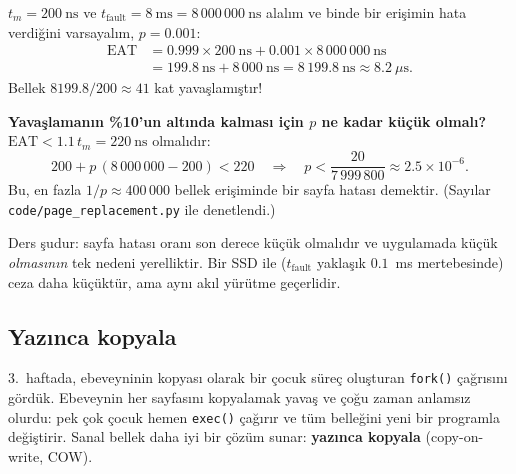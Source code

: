 \documentclass[11pt,a4paper]{article}
\newcommand{\term}[1]{\textbf{\color{mintdeep}#1}}
\newcommand{\cmd}[1]{\texttt{#1}}
\begin{document}
\begin{example}
$t_m = 200\ \text{ns}$ ve $t_{\text{fault}} = 8\ \text{ms} = 8\,000\,000\ \text{ns}$ alalım ve binde bir erişimin hata verdiğini varsayalım, $p = 0.001$:
\begin{align*}
\text{EAT} &= 0.999 \times 200\ \text{ns} + 0.001 \times 8\,000\,000\ \text{ns} \\
           &= 199.8\ \text{ns} + 8\,000\ \text{ns} = 8\,199.8\ \text{ns} \approx 8.2\ \mu\text{s}.
\end{align*}
Bellek $8199.8/200 \approx 41$ kat yavaşlamıştır!

\textbf{Yavaşlamanın \%10'un altında kalması için $p$ ne kadar küçük olmalı?} $\text{EAT} < 1.1\, t_m = 220\ \text{ns}$ olmalıdır:
\[
200 + p\,(8\,000\,000 - 200) < 220
\quad\Longrightarrow\quad
p < \frac{20}{7\,999\,800} \approx 2.5 \times 10^{-6}.
\]
Bu, en fazla $1/p \approx 400\,000$ bellek erişiminde bir sayfa hatası demektir. (Sayılar \cmd{code/page\_replacement.py} ile denetlendi.)
\end{example}

Ders şudur: sayfa hatası oranı son derece küçük olmalıdır ve uygulamada küçük \emph{olmasının} tek nedeni yerelliktir. Bir SSD ile ($t_{\text{fault}}$ yaklaşık $0.1$~ms mertebesinde) ceza daha küçüktür, ama aynı akıl yürütme geçerlidir.

\subsection{Yazınca kopyala}
\label{sec:cow}

3.\ haftada, ebeveyninin kopyası olarak bir çocuk süreç oluşturan \cmd{fork()} çağrısını gördük. Ebeveynin her sayfasını kopyalamak yavaş ve çoğu zaman anlamsız olurdu: pek çok çocuk hemen \cmd{exec()} çağırır ve tüm belleğini yeni bir programla değiştirir. Sanal bellek daha iyi bir çözüm sunar: \term{yazınca kopyala} (copy-on-write, COW).
\end{document}
